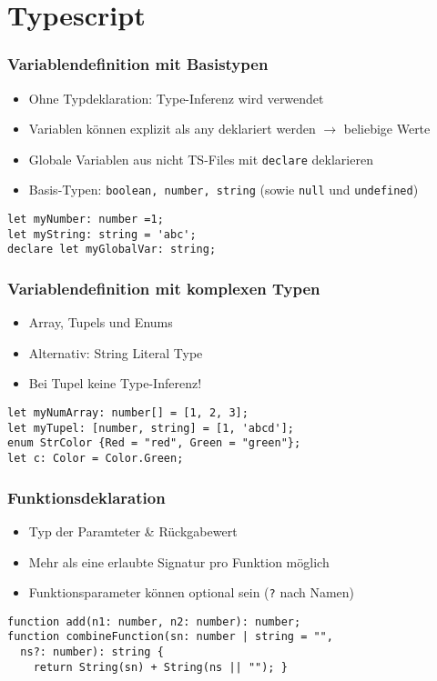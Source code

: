 
\section{Typescript}
\subsubsection{Variablendefinition mit Basistypen}
\begin{itemize}
    \item Ohne Typdeklaration: Type-Inferenz wird verwendet
    \item Variablen können explizit als any deklariert werden $\rightarrow$ beliebige Werte
    \item Globale Variablen aus nicht TS-Files mit \texttt{declare} deklarieren
    \item Basis-Typen: \texttt{boolean, number, string} (sowie \texttt{null} und \texttt{undefined})
\end{itemize}
\begin{lstlisting}
let myNumber: number =1;
let myString: string = 'abc';
declare let myGlobalVar: string;
\end{lstlisting}

\subsubsection{Variablendefinition mit komplexen Typen}
\begin{itemize}
    \item Array, Tupels und Enums
    \item Alternativ: String Literal Type
    \item Bei Tupel keine Type-Inferenz!
\end{itemize}
\begin{lstlisting}
let myNumArray: number[] = [1, 2, 3];
let myTupel: [number, string] = [1, 'abcd'];
enum StrColor {Red = "red", Green = "green"};
let c: Color = Color.Green;
\end{lstlisting}

\subsubsection{Funktionsdeklaration}
\begin{itemize}
    \item Typ der Paramteter \& Rückgabewert
    \item Mehr als eine erlaubte Signatur pro Funktion möglich
    \item Funktionsparameter können optional sein (\texttt{?} nach Namen)
\end{itemize}
\begin{lstlisting}
function add(n1: number, n2: number): number;
function combineFunction(sn: number | string = "",
  ns?: number): string {
    return String(sn) + String(ns || ""); }
\end{lstlisting}

